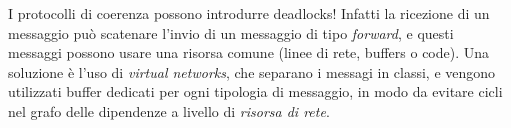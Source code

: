 \begin{warn}
    I protocolli di coerenza possono introdurre deadlocks! Infatti la ricezione di un messaggio può scatenare l'invio di un messaggio di tipo \textit{forward}, e questi messaggi possono usare una risorsa comune (linee di rete, buffers o code). Una soluzione è l'uso di \textit{virtual networks}, che separano i messagi in classi, e vengono utilizzati buffer dedicati per ogni tipologia di messaggio, in modo da evitare cicli nel grafo delle dipendenze a livello di \textit{risorsa di rete}.
\end{warn}



